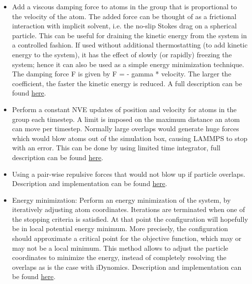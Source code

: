 \documentclass[11pt,a4paper,openright]{article}
\begin{document}
\begin{itemize}
\item Add a viscous damping force to atoms in the group that is proportional to the velocity of the atom. The added force can be thought of as a frictional interaction with implicit solvent, i.e. the no-slip Stokes drag on a spherical particle. This can be useful for draining the kinetic energy from the system in a controlled fashion. If used without additional thermostatting (to add kinetic energy to the system), it has the effect of slowly (or rapidly) freezing the system; hence it can also be used as a simple energy minimization technique. The damping force F is given by F = - gamma * velocity. The larger the coefficient, the faster the kinetic energy is reduced. A full description can be found \href{http://lammps.sandia.gov/doc/fix_viscous.html}{here}.

\item Perform  a constant NVE updates of position and velocity for atoms in the group each timestep. A limit is imposed on the maximum distance an atom can move per timestep. Normally large overlaps would generate huge forces which would blow atoms out of the simulation box, causing LAMMPS to stop with an error. This can be done by using limited time integrator, full description can be found \href{http://lammps.sandia.gov/doc/fix_nve_limit.html}{here}.

\item Using a pair-wise repulsive forces that would not blow up if particle overlaps. Description and implementation can be found \href{http://lammps.sandia.gov/doc/pair_soft.html}{here}.

\item Energy minimization: Perform an energy minimization of the system, by iteratively adjusting atom coordinates. Iterations are terminated when one of the stopping criteria is satisfied. At that point the configuration will hopefully be in local potential energy minimum. More precisely, the configuration should approximate a critical point for the objective function, which may or may not be a local minimum. This method allows to adjust the particle coordinates to minimize the energy, instead of completely resolving the overlaps as is the case with iDynomics. Description and implementation can be found \href{http://lammps.sandia.gov/doc/minimize.html}{here}.
\end{itemize} 
\end{document}
